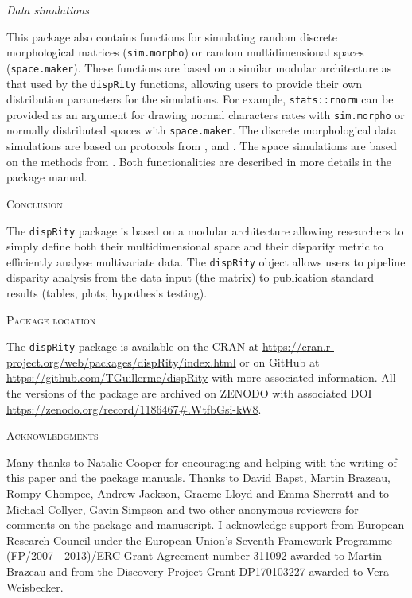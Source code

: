 \documentclass[12pt,letterpaper]{article}
\renewcommand{\section}[1]{%
\bigskip
\begin{center}
\begin{Large}
\normalfont\scshape #1
\medskip
\end{Large}
\end{center}}
\renewcommand{\subsection}[1]{%
\bigskip
\begin{center}
\begin{large}
\normalfont\itshape #1
\end{large}
\end{center}}
\newcommand{\disp}{\texttt{dispRity} }
\begin{document}
\subsection{Data simulations}
This package also contains functions for simulating random discrete morphological matrices (\texttt{sim.morpho}) or random multidimensional spaces (\texttt{space.maker}).
These functions are based on a similar modular architecture as that used by the \texttt{dispRity} functions, allowing users to provide their own distribution parameters for the simulations.
For example, \texttt{stats::rnorm} can be provided as an argument for drawing normal characters rates with \texttt{sim.morpho} or normally distributed spaces with \texttt{space.maker}.
The discrete morphological data simulations are based on protocols from \cite{GuillermeCooper}, \cite{OReilly20160081} and \cite{puttick2017uncertain}.
The space simulations are based on the methods from \cite{diaz2016global}.
Both functionalities are described in more details in the package manual.

\section{Conclusion}
The \disp package is based on a modular architecture allowing researchers to simply define both their multidimensional space and their disparity metric to efficiently analyse multivariate data.
The \disp object allows users to pipeline disparity analysis from the data input (the matrix) to publication standard results (tables, plots, hypothesis testing).

\section{Package location}
The \disp package is available on the CRAN at \url{https://cran.r-project.org/web/packages/dispRity/index.html} or on GitHub at \url{https://github.com/TGuillerme/dispRity} with more associated information.
All the versions of the package are archived on ZENODO with associated DOI \url{https://zenodo.org/record/1186467#.WtfbGsi-kW8}.

\section{Acknowledgments}
Many thanks to Natalie Cooper for encouraging and helping with the writing of this paper and the package manuals.
Thanks to David Bapst, Martin Brazeau, Rompy Chompee, Andrew Jackson, Graeme Lloyd and Emma Sherratt and to Michael Collyer, Gavin Simpson and two other anonymous reviewers for comments on the package and manuscript.
I acknowledge support from European Research Council under the European Union's Seventh Framework Programme (FP/2007 - 2013)/ERC Grant Agreement number 311092 awarded to Martin Brazeau and from the Discovery Project Grant DP170103227 awarded to Vera Weisbecker.



\end{document}
